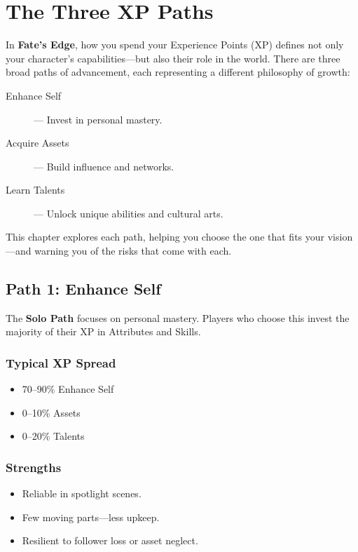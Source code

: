 
\chapter{The Three XP Paths}

In \textbf{Fate’s Edge}, how you spend your Experience Points (XP) defines not only your character’s capabilities—but also their role in the world. There are three broad paths of advancement, each representing a different philosophy of growth:

\begin{description}
  \item[Enhance Self] — Invest in personal mastery.
  \item[Acquire Assets] — Build influence and networks.
  \item[Learn Talents] — Unlock unique abilities and cultural arts.
\end{description}

This chapter explores each path, helping you choose the one that fits your vision—and warning you of the risks that come with each.

\section{Path 1: Enhance Self}

The \textbf{Solo Path} focuses on personal mastery. Players who choose this invest the majority of their XP in Attributes and Skills.

\subsection*{Typical XP Spread}
\begin{itemize}
  \item 70–90\% Enhance Self
  \item 0–10\% Assets
  \item 0–20\% Talents
\end{itemize}

\subsection*{Strengths}
\begin{itemize}
  \item Reliable in spotlight scenes.
  \item Few moving parts—less upkeep.
  \item Resilient to follower loss or asset neglect.
\end{itemize}

